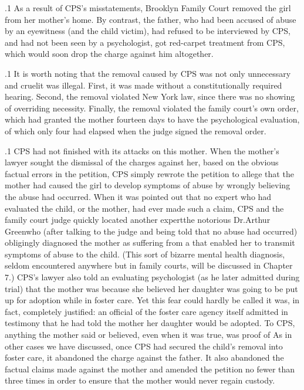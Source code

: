 \documentclass[11pt, twoside]{article}
\begin{document}
{\p.1{%
As a result of CPS's misstatements, Brooklyn Family Court removed
the girl from her mother's home. By contrast, the father, who had been
accused of abuse by an eyewitness (and the child victim), had refused to
be interviewed by CPS, and had not been seen by a psychologist,
got red-carpet treatment from CPS, which would soon drop the charge against
him altogether.
}%

\p.1{%
It is worth noting that the removal caused by CPS was not only
unnecessary and cruel\mdash{}it was illegal. First, it was made without a constitutionally required hearing. Second, the removal violated New York
law, since there was no showing of overriding necessity. Finally, the
removal violated the family court's own order, which had granted the
mother fourteen days to have the psychological evaluation, of which
only four had elapsed when the judge signed the removal order.
}%

\p.1{%
CPS had not finished with its attacks on this mother. When the
mother's lawyer sought the dismissal of the charges against her, based on
the obvious factual errors in the petition, CPS simply rewrote the petition to allege that the mother had caused the girl to develop symptoms of
abuse by wrongly believing the abuse had occurred. When it was pointed
out that no expert who had evaluated the child, or the mother, had ever
made such a claim, CPS and the family court judge quickly located another expert\mdash{}the notorious Dr.\@ Arthur Green\mdash{}who (after talking to
the judge and being told that no abuse had occurred) obligingly diagnosed the mother as suffering from a  that
enabled her to transmit symptoms of abuse to the child. (This sort of
bizarre mental health diagnosis, seldom encountered anywhere but in
family courts, will be discussed in Chapter 7.) CPS's lawyer also told
an evaluating psychologist (as he later admitted during trial) that the
mother was  because she believed her daughter was going to
be put up for adoption while in foster care. Yet this fear could hardly
be called \mdash{}it was, in fact, completely justified: an official of
the foster care agency itself admitted in testimony that he had told the
mother her daughter would be adopted. To CPS, anything the mother
said or believed, even when it was true, was proof of 
As in other cases we have discussed, once CPS had secured the
child's removal into foster care, it abandoned the charge against the
father. It also abandoned the factual claims made against the mother
and amended the petition no fewer than three times in order to ensure that the
mother would never regain custody.
}%

}
\end{document}
